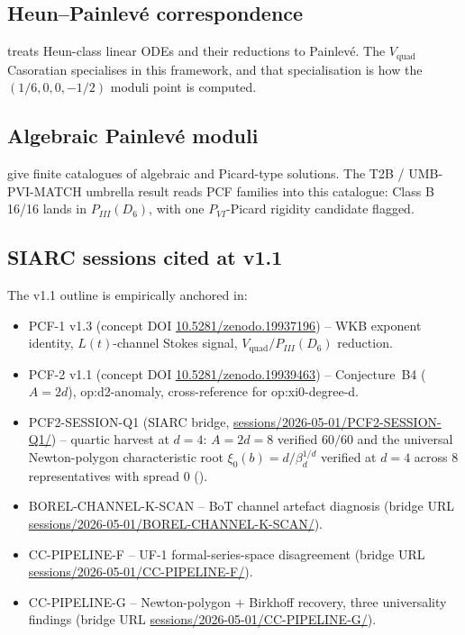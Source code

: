 \documentclass[11pt,reqno]{amsart}
\theoremstyle{plain}
\theoremstyle{definition}
\theoremstyle{remark}
\newcommand{\Lt}{L(t)}
\newcommand{\Vquad}{V_{\mathrm{quad}}}
\begin{document}
\subsection{Heun--Painlev\'e correspondence}
\cite{slavyanov2000special} treats Heun-class linear ODEs and
their reductions to Painlev\'e. The $\Vquad$ Casoratian
specialises in this framework, and that specialisation is
how the $(1/6, 0, 0, -1/2)$ moduli point is computed.

\subsection{Algebraic Painlev\'e moduli}
\cite{mazzocco2001picard, mazzocco2002painleve, iwasaki1991from,
ohyama2006studies, guzzetticlass2012} give finite catalogues
of algebraic and Picard-type solutions. The T2B /
UMB-PVI-MATCH umbrella result \cite{siarc_t2b_v3} reads PCF
families into this catalogue: Class B 16/16 lands in
$P_{III}(D_6)$, with one $P_{VI}$-Picard rigidity candidate
flagged.

\subsection{SIARC sessions cited at v1.1}
The v1.1 outline is empirically anchored in:
\begin{itemize}
\item PCF-1 v1.3 \cite{siarc_pcf1_v13} (concept DOI
\href{https://doi.org/10.5281/zenodo.19937196}{10.5281/zenodo.19937196})
-- WKB exponent identity, $\Lt$-channel Stokes signal,
$\Vquad / P_{III}(D_6)$ reduction.
\item PCF-2 v1.1 \cite{siarc_pcf2_v11} (concept DOI
\href{https://doi.org/10.5281/zenodo.19939463}{10.5281/zenodo.19939463})
-- Conjecture~B4 ($A = 2d$), \textsf{op:d2-anomaly},
cross-reference for \textsf{op:xi0-degree-d}.
\item PCF2-SESSION-Q1 \cite{siarc_pcf2_session_q1}
(SIARC bridge,
\href{https://github.com/papanokechi/siarc-relay-bridge/tree/main/sessions/2026-05-01/PCF2-SESSION-Q1/}{sessions/2026-05-01/PCF2-SESSION-Q1/})
-- quartic harvest at $d=4$: $A = 2d = 8$ verified $60/60$
and the universal Newton-polygon characteristic root
$\xi_0(b) = d / \beta_d^{1/d}$ verified at $d=4$ across $8$
representatives with spread $0$
().
\item BOREL-CHANNEL-K-SCAN \cite{siarc_borel_kscan} -- BoT
channel artefact diagnosis (bridge URL
\href{https://github.com/papanokechi/siarc-relay-bridge/tree/main/sessions/2026-05-01/BOREL-CHANNEL-K-SCAN/}{sessions/2026-05-01/BOREL-CHANNEL-K-SCAN/}).
\item CC-PIPELINE-F \cite{siarc_cc_pipeline_f} -- UF-1
formal-series-space disagreement (bridge URL
\href{https://github.com/papanokechi/siarc-relay-bridge/tree/main/sessions/2026-05-01/CC-PIPELINE-F/}{sessions/2026-05-01/CC-PIPELINE-F/}).
\item CC-PIPELINE-G \cite{siarc_cc_pipeline_g} --
Newton-polygon $+$ Birkhoff recovery, three universality
findings (bridge URL
\href{https://github.com/papanokechi/siarc-relay-bridge/tree/main/sessions/2026-05-01/CC-PIPELINE-G/}{sessions/2026-05-01/CC-PIPELINE-G/}).
\end{itemize}
\end{document}
